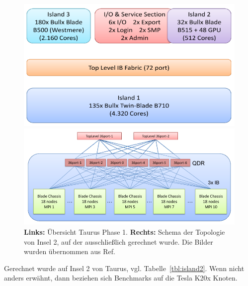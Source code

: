 \documentclass[german,bibnum,beleg,zihtitle,german,hyperref,utf8]{zihpub}
\begin{document}
\begin{figure}[H]
	\centering
	\begin{minipage}{0.5\linewidth}
		\includegraphics[width=\linewidth]{taurusphase1}
	\end{minipage}\begin{minipage}{0.5\linewidth}
		\includegraphics[width=\linewidth]{taurusphase1island1interconnects}
	\end{minipage}
	\caption{\textbf{Links:} Übersicht Taurus Phase 1. \textbf{Rechts:} Schema der Topologie von Insel 2, auf der ausschließlich gerechnet wurde. Die Bilder wurden übernommen aus Ref.\cite{taurusnutzerschulung}}
	\label{fig:taurusphase1}
\end{figure}

Gerechnet wurde auf Insel 2 von Taurus, vgl. Tabelle~\ref{tbl:island2}. Wenn nicht anders erwähnt, dann beziehen sich Benchmarks auf die Tesla K20x Knoten.
\end{document}

